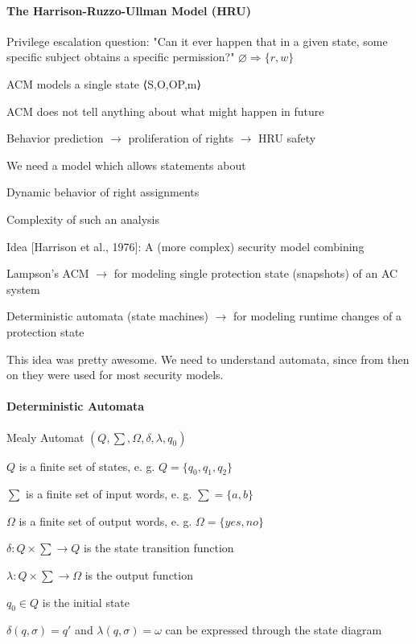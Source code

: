\documentclass[a4paper]{article}
\begin{document}
\begin{multicols}{3}
    \paragraph{The Harrison-Ruzzo-Ullman Model (HRU)}

    Privilege escalation question: "Can it ever happen that in a given state, some specific subject obtains a specific permission?"
    $\varnothing \Rightarrow \{r,w\}$
    \begin{itemize*}
        \item ACM models a single state ⟨S,O,OP,m⟩
        \item ACM does not tell anything about what might happen in future
        \item Behavior prediction $\rightarrow$  proliferation of rights $\rightarrow$ HRU safety
    \end{itemize*}

    We need a model which allows statements about
    \begin{itemize*}
        \item Dynamic behavior of right assignments
        \item Complexity of such an analysis
    \end{itemize*}

    Idea [Harrison et al., 1976]: A (more complex) security model combining
    \begin{itemize*}
        \item Lampson’s ACM $\rightarrow$  for modeling single protection state (snapshots) of an AC system
        \item Deterministic automata (state machines) $\rightarrow$  for modeling runtime changes of a protection state
    \end{itemize*}

    This idea was pretty awesome. We need to understand automata, since from then on they were used for most security models.

    \paragraph{Deterministic Automata}
    Mealy Automat $(Q,\sum,\Omega,\delta,\lambda,q_0)$
    \begin{itemize*}
        \item $Q$ is a finite set of states, e. g. $Q=\{q_0 ,q_1 ,q_2\}$
        \item $\sum$ is a finite set of input words, e. g. $\sum=\{a,b\}$
        \item $\Omega$ is a finite set of output words, e. g. $\Omega=\{yes,no\}$
        \item $\delta:Q\times\sum\rightarrow Q$ is the state transition function
        \item $\lambda:Q\times\sum\rightarrow\Omega$ is the output function
        \item $q_0\in Q$ is the initial state
        \item $\delta(q,\sigma)=q'$ and $\lambda(q,\sigma)=\omega$ can be expressed through the state diagram
    \end{itemize*}


\end{multicols}
\end{document}

